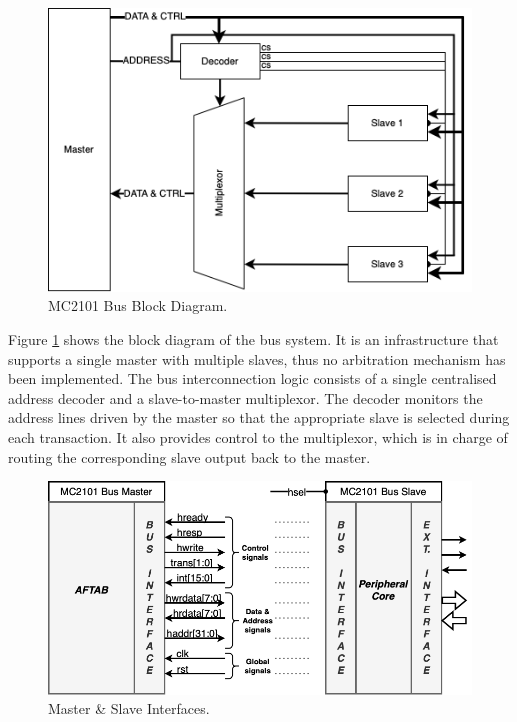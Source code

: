 \begin{figure}[h]
\vspace{0.5cm}
\includegraphics[scale=0.8]{./images/BUS}
\caption{MC2101 Bus Block Diagram.}
\label{fig:bus} %
\end{figure}

Figure \ref{fig:bus} shows the block diagram of the bus system. It is an infrastructure that supports a single master with multiple slaves, thus no arbitration mechanism has been implemented. The bus interconnection logic consists of a single centralised address decoder and a slave-to-master multiplexor. The decoder monitors the address lines driven by the master so that the appropriate slave is selected during each transaction. It also provides control to the multiplexor, which is in charge of routing the corresponding slave output back to the master.

\begin{figure}[h]
\vspace{0.5cm}
\includegraphics[scale=0.5]{./images/MasterSlave}
\caption{Master \& Slave Interfaces.}
\label{fig:masterslave} %
\end{figure}

